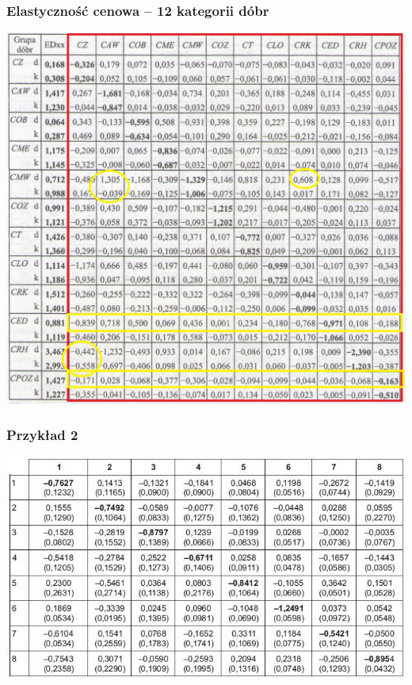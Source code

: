 \documentclass[11pt,usenames,dvipsnames,svgnames,x11names]{beamer}\usepackage[]{graphicx}\usepackage[]{color}
\theoremstyle{definition}
\theoremstyle{remark}
\begin{document}
\begin{frame}
\begin{center}
\frametitle{Elastyczność cenowa -- 12 kategorii dóbr}
\includegraphics[scale=0.65]{5.jpg}
\end{center}
\end{frame}

\begin{frame}
\begin{center}
\frametitle{Przykład 2}
\includegraphics[scale=0.4]{asia.jpg}
\end{center}
\end{frame}
\end{document}
